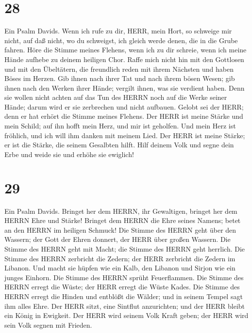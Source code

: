 \hypertarget{section-27}{%
\section{28}\label{section-27}}

 Ein Psalm Davids. Wenn ich rufe zu dir, HERR, mein Hort, so
schweige mir nicht, auf daß nicht, wo du schweigst, ich gleich werde
denen, die in die Grube fahren.  Höre die Stimme meines
Flehens, wenn ich zu dir schreie, wenn ich meine Hände aufhebe zu deinem
heiligen Chor.  Raffe mich nicht hin mit den Gottlosen und
mit den Übeltätern, die freundlich reden mit ihrem Nächsten und haben
Böses im Herzen.  Gib ihnen nach ihrer Tat und nach ihrem
bösen Wesen; gib ihnen nach den Werken ihrer Hände; vergilt ihnen, was
sie verdient haben.  Denn sie wollen nicht achten auf das
Tun des HERRN noch auf die Werke seiner Hände; darum wird er sie
zerbrechen und nicht aufbauen.  Gelobt sei der HERR; denn er
hat erhört die Stimme meines Flehens.  Der HERR ist meine
Stärke und mein Schild; auf ihn hofft mein Herz, und mir ist geholfen.
Und mein Herz ist fröhlich, und ich will ihm danken mit meinem Lied.
 Der HERR ist meine Stärke; er ist die Stärke, die seinem
Gesalbten hilft.  Hilf deinem Volk und segne dein Erbe und
weide sie und erhöhe sie ewiglich!

\hypertarget{section-28}{%
\section{29}\label{section-28}}

 Ein Psalm Davids. Bringet her dem HERRN, ihr Gewaltigen,
bringet her dem HERRN Ehre und Stärke!  Bringet dem HERRN
die Ehre seines Namens; betet an den HERRN im heiligen Schmuck!
 Die Stimme des HERRN geht über den Wassern; der Gott der
Ehren donnert, der HERR über großen Wassern.  Die Stimme des
HERRN geht mit Macht; die Stimme des HERRN geht herrlich. 
Die Stimme des HERRN zerbricht die Zedern; der HERR zerbricht die Zedern
im Libanon.  Und macht sie hüpfen wie ein Kalb, den Libanon
und Sirjon wie ein junges Einhorn.  Die Stimme des HERRN
sprüht Feuerflammen.  Die Stimme des HERRN erregt die Wüste;
der HERR erregt die Wüste Kades.  Die Stimme des HERRN
erregt die Hinden und entblößt die Wälder; und in seinem Tempel sagt ihm
alles Ehre.  Der HERR sitzt, eine Sintflut anzurichten; und
der HERR bleibt ein König in Ewigkeit.  Der HERR wird
seinem Volk Kraft geben; der HERR wird sein Volk segnen mit Frieden.

